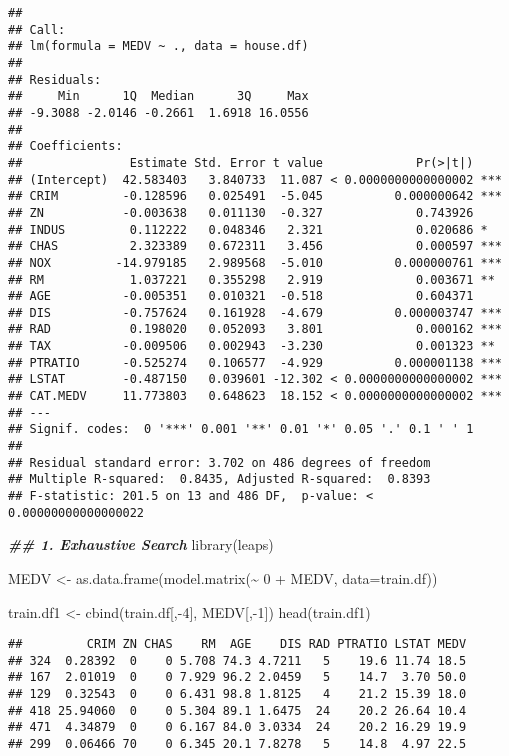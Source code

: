 \documentclass[
]{article}
\newenvironment{Shaded}{\begin{snugshade}}{\end{snugshade}}
\newcommand{\AttributeTok}[1]{\textcolor[rgb]{0.77,0.63,0.00}{#1}}
\newcommand{\DecValTok}[1]{\textcolor[rgb]{0.00,0.00,0.81}{#1}}
\newcommand{\DocumentationTok}[1]{\textcolor[rgb]{0.56,0.35,0.01}{\textbf{\textit{#1}}}}
\newcommand{\FunctionTok}[1]{\textcolor[rgb]{0.00,0.00,0.00}{#1}}
\newcommand{\NormalTok}[1]{#1}
\newcommand{\OtherTok}[1]{\textcolor[rgb]{0.56,0.35,0.01}{#1}}
\newcommand{\SpecialCharTok}[1]{\textcolor[rgb]{0.00,0.00,0.00}{#1}}
\begin{document}
\begin{verbatim}
## 
## Call:
## lm(formula = MEDV ~ ., data = house.df)
## 
## Residuals:
##     Min      1Q  Median      3Q     Max 
## -9.3088 -2.0146 -0.2661  1.6918 16.0556 
## 
## Coefficients:
##               Estimate Std. Error t value             Pr(>|t|)    
## (Intercept)  42.583403   3.840733  11.087 < 0.0000000000000002 ***
## CRIM         -0.128596   0.025491  -5.045          0.000000642 ***
## ZN           -0.003638   0.011130  -0.327             0.743926    
## INDUS         0.112222   0.048346   2.321             0.020686 *  
## CHAS          2.323389   0.672311   3.456             0.000597 ***
## NOX         -14.979185   2.989568  -5.010          0.000000761 ***
## RM            1.037221   0.355298   2.919             0.003671 ** 
## AGE          -0.005351   0.010321  -0.518             0.604371    
## DIS          -0.757624   0.161928  -4.679          0.000003747 ***
## RAD           0.198020   0.052093   3.801             0.000162 ***
## TAX          -0.009506   0.002943  -3.230             0.001323 ** 
## PTRATIO      -0.525274   0.106577  -4.929          0.000001138 ***
## LSTAT        -0.487150   0.039601 -12.302 < 0.0000000000000002 ***
## CAT.MEDV     11.773803   0.648623  18.152 < 0.0000000000000002 ***
## ---
## Signif. codes:  0 '***' 0.001 '**' 0.01 '*' 0.05 '.' 0.1 ' ' 1
## 
## Residual standard error: 3.702 on 486 degrees of freedom
## Multiple R-squared:  0.8435, Adjusted R-squared:  0.8393 
## F-statistic: 201.5 on 13 and 486 DF,  p-value: < 0.00000000000000022
\end{verbatim}

\begin{Shaded}
\begin{Highlighting}[]
\DocumentationTok{\#\# 1. Exhaustive Search}
\FunctionTok{library}\NormalTok{(leaps)}

\NormalTok{MEDV }\OtherTok{\textless{}{-}} \FunctionTok{as.data.frame}\NormalTok{(}\FunctionTok{model.matrix}\NormalTok{(}\SpecialCharTok{\textasciitilde{}} \DecValTok{0} \SpecialCharTok{+}\NormalTok{ MEDV, }\AttributeTok{data=}\NormalTok{train.df))}

\NormalTok{train.df1 }\OtherTok{\textless{}{-}} \FunctionTok{cbind}\NormalTok{(train.df[,}\SpecialCharTok{{-}}\DecValTok{4}\NormalTok{], MEDV[,}\SpecialCharTok{{-}}\DecValTok{1}\NormalTok{])}
\FunctionTok{head}\NormalTok{(train.df1)}
\end{Highlighting}
\end{Shaded}

\begin{verbatim}
##         CRIM ZN CHAS    RM  AGE    DIS RAD PTRATIO LSTAT MEDV
## 324  0.28392  0    0 5.708 74.3 4.7211   5    19.6 11.74 18.5
## 167  2.01019  0    0 7.929 96.2 2.0459   5    14.7  3.70 50.0
## 129  0.32543  0    0 6.431 98.8 1.8125   4    21.2 15.39 18.0
## 418 25.94060  0    0 5.304 89.1 1.6475  24    20.2 26.64 10.4
## 471  4.34879  0    0 6.167 84.0 3.0334  24    20.2 16.29 19.9
## 299  0.06466 70    0 6.345 20.1 7.8278   5    14.8  4.97 22.5
\end{verbatim}
\end{document}
